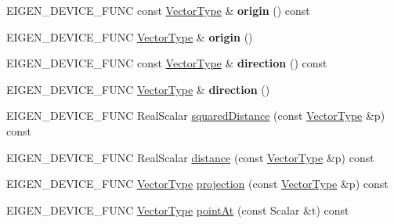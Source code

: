 \begin{DoxyCompactItemize}
E\+I\+G\+E\+N\+\_\+\+D\+E\+V\+I\+C\+E\+\_\+\+F\+U\+NC const \mbox{\hyperlink{class_eigen_1_1_matrix}{Vector\+Type}} \& {\bfseries origin} () const
\item 
\mbox{\label{class_eigen_1_1_parametrized_line_a13584deae04a4078f35a8b590d3868fb}} 
E\+I\+G\+E\+N\+\_\+\+D\+E\+V\+I\+C\+E\+\_\+\+F\+U\+NC \mbox{\hyperlink{class_eigen_1_1_matrix}{Vector\+Type}} \& {\bfseries origin} ()
\item 
\mbox{\label{class_eigen_1_1_parametrized_line_a38c1c1eb94eb945a70a567ceadf3c950}} 
E\+I\+G\+E\+N\+\_\+\+D\+E\+V\+I\+C\+E\+\_\+\+F\+U\+NC const \mbox{\hyperlink{class_eigen_1_1_matrix}{Vector\+Type}} \& {\bfseries direction} () const
\item 
\mbox{\label{class_eigen_1_1_parametrized_line_a2e7606d3a6cbf501a688be8845785c5d}} 
E\+I\+G\+E\+N\+\_\+\+D\+E\+V\+I\+C\+E\+\_\+\+F\+U\+NC \mbox{\hyperlink{class_eigen_1_1_matrix}{Vector\+Type}} \& {\bfseries direction} ()
\item 
E\+I\+G\+E\+N\+\_\+\+D\+E\+V\+I\+C\+E\+\_\+\+F\+U\+NC Real\+Scalar \mbox{\hyperlink{class_eigen_1_1_parametrized_line_a7dc9009fd67184754823cf90ae8f6eae}{squared\+Distance}} (const \mbox{\hyperlink{class_eigen_1_1_matrix}{Vector\+Type}} \&p) const
\item 
E\+I\+G\+E\+N\+\_\+\+D\+E\+V\+I\+C\+E\+\_\+\+F\+U\+NC Real\+Scalar \mbox{\hyperlink{class_eigen_1_1_parametrized_line_a1c038c9559f76794369bd2ae74e93b9f}{distance}} (const \mbox{\hyperlink{class_eigen_1_1_matrix}{Vector\+Type}} \&p) const
\item 
E\+I\+G\+E\+N\+\_\+\+D\+E\+V\+I\+C\+E\+\_\+\+F\+U\+NC \mbox{\hyperlink{class_eigen_1_1_matrix}{Vector\+Type}} \mbox{\hyperlink{class_eigen_1_1_parametrized_line_a3c7a7a3db3d4380c538d55fc8df77f87}{projection}} (const \mbox{\hyperlink{class_eigen_1_1_matrix}{Vector\+Type}} \&p) const
\item 
E\+I\+G\+E\+N\+\_\+\+D\+E\+V\+I\+C\+E\+\_\+\+F\+U\+NC \mbox{\hyperlink{class_eigen_1_1_matrix}{Vector\+Type}} \mbox{\hyperlink{class_eigen_1_1_parametrized_line_ae0a510cc78156974ab5a7fb8a6b2326a}{point\+At}} (const Scalar \&t) const
\item 
\mbox{\label{class_eigen_1_1_parametrized_line_a32a79d93c43fbfd5c70dd95432926505}} 

\end{DoxyCompactItemize}
